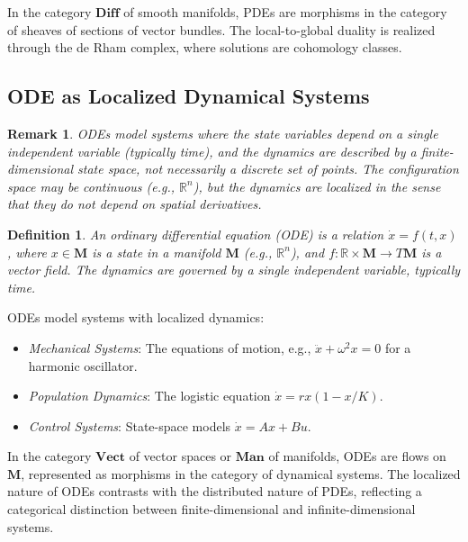 \documentclass{article}
\theoremstyle{plain}
\newtheorem{definition}{Definition}[section]
\newtheorem{remark}{Remark}[section]
\newcommand{\cat}[1]{\mathbf{#1}}
\begin{document}
In the category \(\cat{Diff}\) of smooth manifolds,
PDEs are morphisms in the category of sheaves of sections of vector bundles.
The local-to-global duality is realized through the de Rham complex,
where solutions are cohomology classes.

\subsection{ODE as Localized Dynamical Systems}

\begin{remark}
ODEs model systems where the state variables depend on a single independent variable (typically time),
and the dynamics are described by a finite-dimensional state space,
not necessarily a discrete set of points. The configuration space may be
continuous (e.g., \(\mathbb{R}^n\)), but the dynamics are localized in
the sense that they do not depend on spatial derivatives.
\end{remark}

\begin{definition}
An \emph{ordinary differential equation} (ODE) is a relation \(\dot{x} = f(t, x)\),
where \(x \in \cat{M}\) is a state in a manifold \(\cat{M}\) (e.g., \(\mathbb{R}^n\)),
and \(f: \mathbb{R} \times \cat{M} \to T\cat{M}\) is a vector field.
The dynamics are governed by a single independent variable, typically time.
\end{definition}

ODEs model systems with localized dynamics:
\begin{itemize}
    \item \emph{Mechanical Systems}: The equations of motion, e.g., \(\ddot{x} + \omega^2 x = 0\) for a harmonic oscillator.
    \item \emph{Population Dynamics}: The logistic equation \(\dot{x} = rx(1 - x/K)\).
    \item \emph{Control Systems}: State-space models \(\dot{x} = Ax + Bu\).
\end{itemize}

In the category \(\cat{Vect}\) of vector spaces or \(\cat{Man}\) of manifolds,
ODEs are flows on \(\cat{M}\), represented as morphisms in the category of dynamical systems.
The localized nature of ODEs contrasts with the distributed nature of PDEs,
reflecting a categorical distinction between finite-dimensional
and infinite-dimensional systems.
\end{document}
